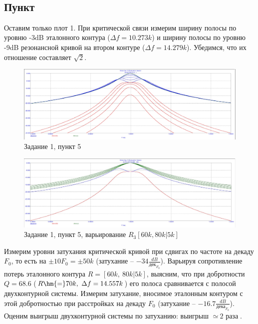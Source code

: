 \documentclass[a4paper, 14pt]{extarticle}%
\begin{document}
~

\subsection{Пункт}

Оставим только плот 1. При критической связи измерим ширину полосы по уровню -3dB эталонного контура ($\Delta f = 10.273k$) и ширину полосы по уровню -9dB резонансной кривой на втором контуре ($\Delta f = 14.279k$). Убедимся, что их отношение составляет $\sqrt{2}$.


\begin{figure}[h!]
	\centering
			\includegraphics[width=1.1\linewidth]{1.5.jpg}
            \caption{Задание 1,  пункт 5}
	\label{A}
\end{figure}

\begin{figure}[h!]
	\centering
			\includegraphics[width=1.1\linewidth]{1.5varR1.jpg}
            \caption{Задание 1,  пункт 5, варьирование $R_3 [60k, 80k|5k]$}
	\label{A}
\end{figure}


Измерим уровни затухания критической кривой при сдвигах по частоте на декаду $F_0$, то есть на $\pm 10F_0 = \pm 50k$ (затухание -- $-34\frac{dB}{\text{дек}_{F_0}}$). Варьируя сопротивление потерь эталонного контура $R = [60k,~80k|5k]$, выясним, что при добротности $Q = 68.6$ ($R \hm{=} 70k,~\Delta f = 14.557k$) его полоса сравнивается с полосой двухконтурной системы. Измерим затухание, вносимое эталонным контуром с этой добротностью при расстройках на декаду $F_0$ (затухание -- $-16.7\frac{dB}{\text{дека}_{F_0}}$). Оценим выигрыш двухконтурной системы по затуханию: выигрыш $\simeq~\text{2 раза}$.
\end{document}
